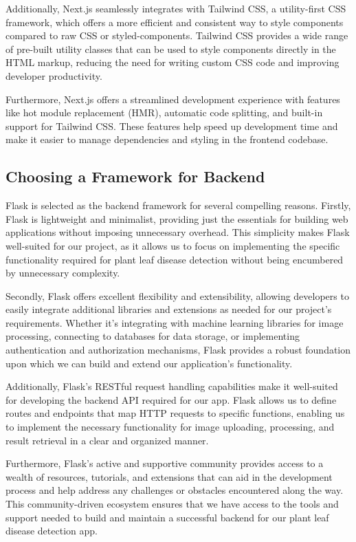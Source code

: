 \documentclass{article}
\begin{document}
Additionally, Next.js seamlessly integrates with Tailwind CSS, a utility-first CSS framework, which offers a more efficient and consistent way to style components compared to raw CSS or styled-components. Tailwind CSS provides a wide range of pre-built utility classes that can be used to style components directly in the HTML markup, reducing the need for writing custom CSS code and improving developer productivity.

Furthermore, Next.js offers a streamlined development experience with features like hot module replacement (HMR), automatic code splitting, and built-in support for Tailwind CSS. These features help speed up development time and make it easier to manage dependencies and styling in the frontend codebase.




\subsection{Choosing a Framework for Backend}

Flask is selected as the backend framework for several compelling reasons. Firstly, Flask is lightweight and minimalist, providing just the essentials for building web applications without imposing unnecessary overhead. This simplicity makes Flask well-suited for our project, as it allows us to focus on implementing the specific functionality required for plant leaf disease detection without being encumbered by unnecessary complexity.

Secondly, Flask offers excellent flexibility and extensibility, allowing developers to easily integrate additional libraries and extensions as needed for our project's requirements. Whether it's integrating with machine learning libraries for image processing, connecting to databases for data storage, or implementing authentication and authorization mechanisms, Flask provides a robust foundation upon which we can build and extend our application's functionality.

Additionally, Flask's RESTful request handling capabilities make it well-suited for developing the backend API required for our app. Flask allows us to define routes and endpoints that map HTTP requests to specific functions, enabling us to implement the necessary functionality for image uploading, processing, and result retrieval in a clear and organized manner.

Furthermore, Flask's active and supportive community provides access to a wealth of resources, tutorials, and extensions that can aid in the development process and help address any challenges or obstacles encountered along the way. This community-driven ecosystem ensures that we have access to the tools and support needed to build and maintain a successful backend for our plant leaf disease detection app.
\end{document}
